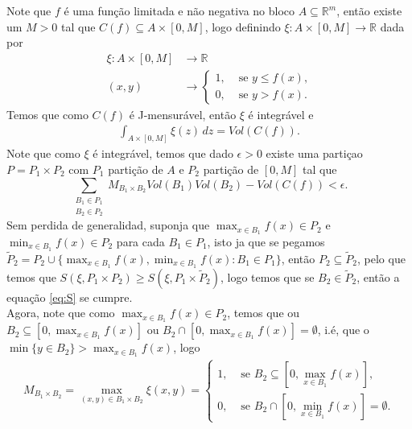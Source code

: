 \begin{homeworkProblem}[Seção 3-5]
\begin{solution}
    Note que $f$ é uma função limitada e não negativa no bloco $A\subseteq\mathbb{R}^{m}$, então existe um $M>0$ tal que $C(f)\subseteq A\times [0,M]$, logo definindo $\xi:A\times[0,M]\to\mathbb{R}$ dada por
    \begin{align*}
      \xi:A\times[0,M]&\to\mathbb{R}\\
                    (x,y)&\to\begin{cases}
                      1, &\text{ se } y\leq f(x) \text{,} \\
                      0, &\text{ se } y>f(x).
                    \end{cases}
    \end{align*}
    Temos que como $C(f)$ é J-mensurável, então $\xi$ é integrável e
    \begin{align*}
      \int_{A\times[0,M]}\xi(z)\,dz= Vol(C(f)).
    \end{align*}
    Note que como $\xi$ é integrável, temos que dado $\epsilon>0$ existe uma partiçao $P=P_1\times P_2$ com $P_1$ partição de $A$ e $P_2$ partição de $[0,M]$ tal que
    \begin{equation}\label{eq:S}
      \sum_{\substack{B_1\in P_1\\ B_2\in P_2}}M_{B_1\times B_2}Vol(B_1)Vol(B_2)-Vol(C(f))<\epsilon.
    \end{equation}
    Sem perdida de generalidad, suponja que $\displaystyle \max_{x\in B_1}f(x)\in P_2$ e $\displaystyle \min_{x\in B_1}f(x)\in P_2$ para cada $B_1\in P_1$, isto ja que se pegamos $\tilde{P}_2=P_2\cup\{\max_{x\in B_1}f(x),\min_{x\in B_1}f(x):B_1\in P_1\}$, então $P_2\subseteq \tilde{P}_2$, pelo que temos que $S(\xi, P_1\times P_2)\geq S(\xi,P_1\times\tilde{P}_2)$, logo temos que se $B_2\in \tilde{P}_2$, então a equação \eqref{eq:S} se cumpre.\\
    Agora, note que como $\max_{x\in B_1}f(x)\in P_2$, temos que ou $B_2\subseteq [0,\max_{x\in B_1}f(x)]$ ou $B_2\cap [0,\max_{x\in B_1}f(x)]=\emptyset$, i.é, que o $\min\{y\in B_2\}> \max_{x\in B_1}f(x)$, logo
    \begin{align*}
      M_{B_1\times B_2}=\max_{(x,y)\in B_1\times B_2}\xi(x,y)= 
      \begin{cases}
        1, &\text{ se } \displaystyle B_2\subseteq \left[0,\max_{x\in B_1}f(x)\right]\text{,} \\
        0, &\text{ se } \displaystyle B_2\cap \left[0,\min_{x\in B_1}f(x)\right]=\emptyset.
      \end{cases}
    \end{align*}

\end{solution}
\end{homeworkProblem}
